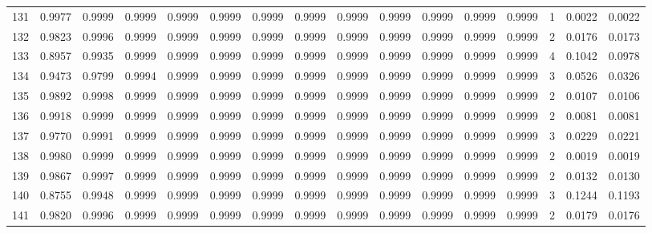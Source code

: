 \begin{tabular}{lrrrrrrrrrrrrrrr}
131 &      0.9977 &  0.9999 &  0.9999 &  0.9999 &  0.9999 &  0.9999 &  0.9999 &  0.9999 &  0.9999 &  0.9999 &   0.9999 &     0.9999 &      1 &                    0.0022 &                     0.0022 \\
132 &      0.9823 &  0.9996 &  0.9999 &  0.9999 &  0.9999 &  0.9999 &  0.9999 &  0.9999 &  0.9999 &  0.9999 &   0.9999 &     0.9999 &      2 &                    0.0176 &                     0.0173 \\
133 &      0.8957 &  0.9935 &  0.9999 &  0.9999 &  0.9999 &  0.9999 &  0.9999 &  0.9999 &  0.9999 &  0.9999 &   0.9999 &     0.9999 &      4 &                    0.1042 &                     0.0978 \\
134 &      0.9473 &  0.9799 &  0.9994 &  0.9999 &  0.9999 &  0.9999 &  0.9999 &  0.9999 &  0.9999 &  0.9999 &   0.9999 &     0.9999 &      3 &                    0.0526 &                     0.0326 \\
135 &      0.9892 &  0.9998 &  0.9999 &  0.9999 &  0.9999 &  0.9999 &  0.9999 &  0.9999 &  0.9999 &  0.9999 &   0.9999 &     0.9999 &      2 &                    0.0107 &                     0.0106 \\
136 &      0.9918 &  0.9999 &  0.9999 &  0.9999 &  0.9999 &  0.9999 &  0.9999 &  0.9999 &  0.9999 &  0.9999 &   0.9999 &     0.9999 &      2 &                    0.0081 &                     0.0081 \\
137 &      0.9770 &  0.9991 &  0.9999 &  0.9999 &  0.9999 &  0.9999 &  0.9999 &  0.9999 &  0.9999 &  0.9999 &   0.9999 &     0.9999 &      3 &                    0.0229 &                     0.0221 \\
138 &      0.9980 &  0.9999 &  0.9999 &  0.9999 &  0.9999 &  0.9999 &  0.9999 &  0.9999 &  0.9999 &  0.9999 &   0.9999 &     0.9999 &      2 &                    0.0019 &                     0.0019 \\
139 &      0.9867 &  0.9997 &  0.9999 &  0.9999 &  0.9999 &  0.9999 &  0.9999 &  0.9999 &  0.9999 &  0.9999 &   0.9999 &     0.9999 &      2 &                    0.0132 &                     0.0130 \\
140 &      0.8755 &  0.9948 &  0.9999 &  0.9999 &  0.9999 &  0.9999 &  0.9999 &  0.9999 &  0.9999 &  0.9999 &   0.9999 &     0.9999 &      3 &                    0.1244 &                     0.1193 \\
141 &      0.9820 &  0.9996 &  0.9999 &  0.9999 &  0.9999 &  0.9999 &  0.9999 &  0.9999 &  0.9999 &  0.9999 &   0.9999 &     0.9999 &      2 &                    0.0179 &                     0.0176 \\

\end{tabular}

